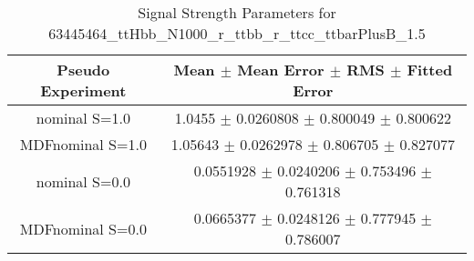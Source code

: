 \begin{table}
\centering
\caption{Signal Strength Parameters for 63445464\_ttHbb\_N1000\_r\_ttbb\_r\_ttcc\_ttbarPlusB\_1.5}
\begin{tabular}{cc}
\toprule
Pseudo Experiment & Mean $\pm$ Mean Error $\pm$ RMS $\pm$ Fitted Error\\
\midrule
nominal S=1.0 & \num{1.0455} $\pm$ \num{0.0260808} $\pm$ \num{0.800049} $\pm$ \num{0.800622}\\
MDFnominal S=1.0 & \num{1.05643} $\pm$ \num{0.0262978} $\pm$ \num{0.806705} $\pm$ \num{0.827077}\\
nominal S=0.0 & \num{0.0551928} $\pm$ \num{0.0240206} $\pm$ \num{0.753496} $\pm$ \num{0.761318}\\
MDFnominal S=0.0 & \num{0.0665377} $\pm$ \num{0.0248126} $\pm$ \num{0.777945} $\pm$ \num{0.786007}\\
\bottomrule
\end{tabular}
\end{table}